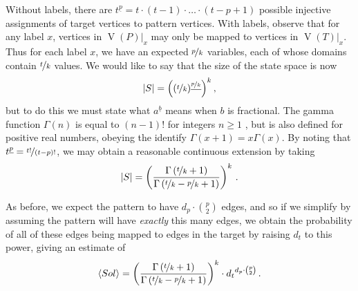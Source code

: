 \documentclass[twoside,11pt]{article}
\begin{document}
Without labels, there are $t^{\underline{p}} = t \cdot (t - 1) \cdot \ldots \cdot (t - p + 1)$
possible injective assignments of target vertices to pattern vertices.  With labels, observe that
for any label $x$, vertices in $\operatorname{V}(P)|_x$ may only be mapped to vertices in
$\operatorname{V}(T)|_x$.  Thus for each label $x$, we have an expected $\nicefrac{p}{k}$ variables,
each of whose domains contain $\nicefrac{t}{k}$ values. We would like to say that the size of the
state space is now \[ |S| = \left((\nicefrac{t}{k})^{\underline{\nicefrac{p}{k}}}\right)^{k}
\textnormal{,} \] but to do this we must state what $a^{\underline{b}}$ means when $b$ is
fractional. The gamma function $\Gamma(n)$ is equal to $(n - 1)!$ for integers $n \ge 1$
\cite{Davis59}, but is also defined for positive real numbers, obeying the identify $\Gamma(x + 1)
= x\Gamma(x)$. By noting that $t^{\underline{p}} = \nicefrac{t!}{(t - p)!}$, we may obtain a
reasonable continuous extension by taking \[ |S| = \left(\frac{\Gamma\left(\nicefrac{t}{k} +
1\right)}{\Gamma\left(\nicefrac{t}{k} - \nicefrac{p}{k} + 1\right)}\right)^{k} \textnormal{\,.} \]

As before, we expect the pattern to have $d_p \cdot \binom{p}{2}$ edges, and so if we simplify by
assuming the pattern will have \emph{exactly} this many edges, we obtain the
probability of all of these edges being mapped to edges in the target by raising $d_t$ to this
power, giving an estimate of \begin{equation}\label{equation:non-induced-labelled-prediction} \langle Sol \rangle = \left(
    \frac{\Gamma\left(\nicefrac{t}{k} + 1\right)}{\Gamma\left(\nicefrac{t}{k} - \nicefrac{p}{k} +
1\right)} \right)^{k}  \cdot
{d_t}^{d_p \cdot \binom{p}{2}} \textnormal{\,.} \end{equation}
\end{document}
